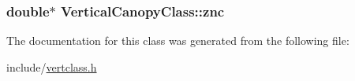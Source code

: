 \subsubsection[{\texorpdfstring{znc}{znc}}]{\setlength{\rightskip}{0pt plus 5cm}double$\ast$ Vertical\+Canopy\+Class\+::znc}\hypertarget{class_vertical_canopy_class_a5b54cfab7934490c7d679a3548e9a1da}{}\label{class_vertical_canopy_class_a5b54cfab7934490c7d679a3548e9a1da}


The documentation for this class was generated from the following file\+:\begin{DoxyCompactItemize}
\item 
include/\hyperlink{vertclass_8h}{vertclass.\+h}\end{DoxyCompactItemize}
